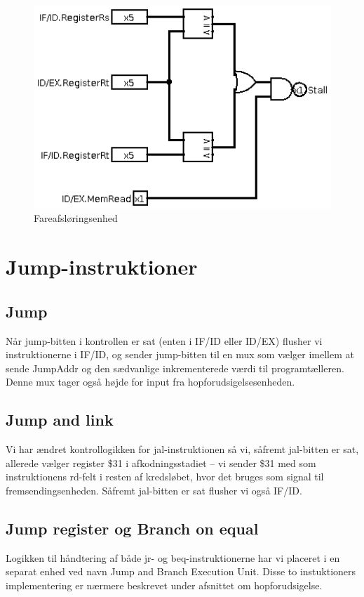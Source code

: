 \documentclass[10pt,a4paper,danish]{article}
\begin{document}
\begin{figure}[htb]
\begin{center}
\leavevmode
\includegraphics[width=1\textwidth]{hazard_detection_unit.png}
\end{center}
\caption{Fareafsløringsenhed}
\label{fig:hdu} 
\end{figure}

\section{Jump-instruktioner}

\subsection{Jump}
Når jump-bitten i kontrollen er sat (enten i IF/ID eller ID/EX) flusher vi 
instruktionerne i IF/ID, og sender jump-bitten til en mux som vælger imellem
at sende JumpAddr og den sædvanlige inkrementerede værdi til programtælleren.
Denne mux tager også højde for input fra hopforudsigelsesenheden. 

\subsection{Jump and link}
Vi har ændret kontrollogikken for jal-instruktionen så vi, såfremt
jal-bitten er sat, allerede vælger register \$31 i afkodningsstadiet
 -- vi sender \$31 med som instruktionens rd-felt i resten af kredsløbet,
hvor det bruges som signal til fremsendingsenheden. Såfremt jal-bitten 
er sat flusher vi også IF/ID. 

\subsection{Jump register og Branch on equal}
Logikken til håndtering af både jr- og beq-instruktionerne har vi 
placeret i en separat enhed ved navn Jump and Branch Execution Unit. Disse to 
instuktioners implementering er nærmere beskrevet under afsnittet
om hopforudsigelse. 
\end{document}
